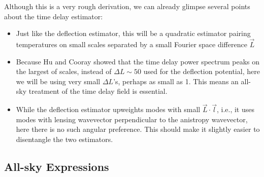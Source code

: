 \documentclass[prd,amsmath,amssymb,floatfix,superscriptaddress,nofootinbib,preprintnumbers]{revtex4-1}
\begin{document}
Although this is a very rough derivation, we can already glimpse several points about the time delay estimator:
\begin{itemize}
\item Just like the deflection estimator, this will be a quadratic estimator pairing temperatures on small scales separated by a small Fourier space difference $\vec L$
\item Because Hu and Cooray showed that the time delay power spectrum peaks on the largest of scales, instead of $\Delta L\sim 50$ used for the deflection potential, here we will be using very small $\Delta L$'s, perhaps as small as 1. This means an all-sky treatment of the time delay field is essential.
\item While the deflection estimator upweights modes with small $\vec L\cdot \vec l$, i.e., it uses modes with lensing wavevector perpendicular to the anistropy wavevector, here there is no such angular preference. This should make it slightly easier to disentangle the two estimators.
\end{itemize}
\subsection{All-sky Expressions}
\end{document}
